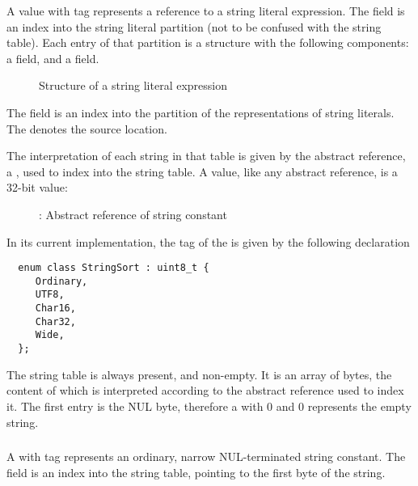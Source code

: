 A  value with tag  represents a reference to a string literal
expression.  The  field is an index into the string literal partition (not to be confused with the string table).
Each entry of that partition is a structure with the following components: a  field, and a  field.
%
\begin{figure}[H]
	\centering
	\caption{Structure of a string literal expression}
	\label{fig:ifc-string-literal-expression-structure}
\end{figure}
%
The  field is an index into the partition of the representations of string literals.
The  denotes the source location.

 The interpretation of each
string in that table is given by the abstract reference, a , used to index into
the string table.  A  value, like any abstract reference, is a 32-bit value:
\begin{figure}[H]
  \centering
  \caption{: Abstract reference of string constant}
  \label{fig:ifc-string-index}
\end{figure}

In its current implementation, the tag of the  is given by the following declaration
\begin{lstlisting}
  enum class StringSort : uint8_t {
     Ordinary,
     UTF8,
     Char16,
     Char32,
     Wide,
  };
\end{lstlisting}

The string table is always present, and non-empty.  It is an array of bytes, the content of which is interpreted according to the abstract reference used to index it.
The first entry is the NUL byte, therefore a  with 0  and 0  represents the empty string.


\subsubsection{}
A  with tag   represents an ordinary, narrow NUL-terminated string constant.
The  field is an index into the string table, pointing to the first byte of the string.


